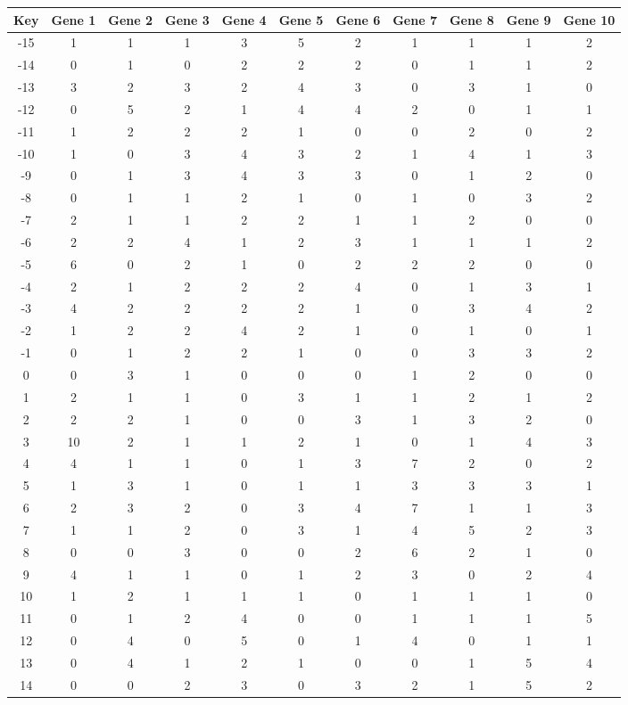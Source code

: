 \begin{tabular}{|c|c|c|c|c|c|c|c|c|c|c|}
\hline
Key & Gene 1 & Gene 2 & Gene 3 & Gene 4 & Gene 5 & Gene 6 & Gene 7 & Gene 8 & Gene 9 & Gene 10 \\
\hline
-15 & 1 & 1 & 1 & 3 & 5 & 2 & 1 & 1 & 1 & 2 \\
-14 & 0 & 1 & 0 & 2 & 2 & 2 & 0 & 1 & 1 & 2 \\
-13 & 3 & 2 & 3 & 2 & 4 & 3 & 0 & 3 & 1 & 0 \\
-12 & 0 & 5 & 2 & 1 & 4 & 4 & 2 & 0 & 1 & 1 \\
-11 & 1 & 2 & 2 & 2 & 1 & 0 & 0 & 2 & 0 & 2 \\
-10 & 1 & 0 & 3 & 4 & 3 & 2 & 1 & 4 & 1 & 3 \\
-9 & 0 & 1 & 3 & 4 & 3 & 3 & 0 & 1 & 2 & 0 \\
-8 & 0 & 1 & 1 & 2 & 1 & 0 & 1 & 0 & 3 & 2 \\
-7 & 2 & 1 & 1 & 2 & 2 & 1 & 1 & 2 & 0 & 0 \\
-6 & 2 & 2 & 4 & 1 & 2 & 3 & 1 & 1 & 1 & 2 \\
-5 & 6 & 0 & 2 & 1 & 0 & 2 & 2 & 2 & 0 & 0 \\
-4 & 2 & 1 & 2 & 2 & 2 & 4 & 0 & 1 & 3 & 1 \\
-3 & 4 & 2 & 2 & 2 & 2 & 1 & 0 & 3 & 4 & 2 \\
-2 & 1 & 2 & 2 & 4 & 2 & 1 & 0 & 1 & 0 & 1 \\
-1 & 0 & 1 & 2 & 2 & 1 & 0 & 0 & 3 & 3 & 2 \\
0 & 0 & 3 & 1 & 0 & 0 & 0 & 1 & 2 & 0 & 0 \\
1 & 2 & 1 & 1 & 0 & 3 & 1 & 1 & 2 & 1 & 2 \\
2 & 2 & 2 & 1 & 0 & 0 & 3 & 1 & 3 & 2 & 0 \\
3 & 10 & 2 & 1 & 1 & 2 & 1 & 0 & 1 & 4 & 3 \\
4 & 4 & 1 & 1 & 0 & 1 & 3 & 7 & 2 & 0 & 2 \\
5 & 1 & 3 & 1 & 0 & 1 & 1 & 3 & 3 & 3 & 1 \\
6 & 2 & 3 & 2 & 0 & 3 & 4 & 7 & 1 & 1 & 3 \\
7 & 1 & 1 & 2 & 0 & 3 & 1 & 4 & 5 & 2 & 3 \\
8 & 0 & 0 & 3 & 0 & 0 & 2 & 6 & 2 & 1 & 0 \\
9 & 4 & 1 & 1 & 0 & 1 & 2 & 3 & 0 & 2 & 4 \\
10 & 1 & 2 & 1 & 1 & 1 & 0 & 1 & 1 & 1 & 0 \\
11 & 0 & 1 & 2 & 4 & 0 & 0 & 1 & 1 & 1 & 5 \\
12 & 0 & 4 & 0 & 5 & 0 & 1 & 4 & 0 & 1 & 1 \\
13 & 0 & 4 & 1 & 2 & 1 & 0 & 0 & 1 & 5 & 4 \\
14 & 0 & 0 & 2 & 3 & 0 & 3 & 2 & 1 & 5 & 2 \\
\hline
\end{tabular}